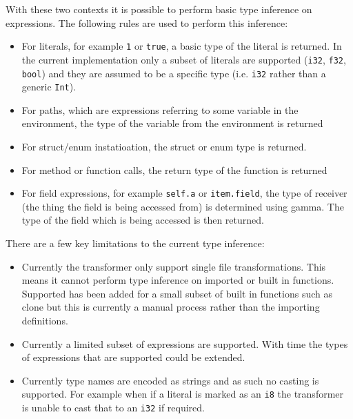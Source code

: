 \documentclass[ oneside,%
                    author={James Elgar},
                    degree={MEng},
                     title={Bidirectional transformer between functional and \\ object-oriented programming in Rust},
                  subtitle={}]{dissertation}
\newcommand{\rust}[1]{\texttt{#1}}
\begin{document}
With these two contexts it is possible to perform basic type inference on expressions. The following rules are used to perform this inference:

\begin{itemize}
    \item For literals, for example \rust{1} or \rust{true}, a basic type of the literal is returned. In the current implementation only a subset of literals are supported (\rust{i32}, \rust{f32}, \rust{bool}) and they are assumed to be a specific type (i.e. \rust{i32} rather than a generic \verb|Int|).
    \item For paths, which are expressions referring to some variable in the environment, the type of the variable from the environment is returned 
    \item For struct/enum instatioation, the struct or enum type is returned.
    \item For method or function calls, the return type of the function is returned
    \item For field expressions, for example \rust{self.a} or \rust{item.field}, the type of receiver (the thing the field is being accessed from) is determined using gamma. The type of the field which is being accessed is then returned.
\end{itemize}

There are a few key limitations to the current type inference:

\begin{itemize}
    \item  Currently the transformer only support single file transformations. This means it cannot perform type inference on imported or built in functions. Supported has been added for a small subset of built in functions such as clone but this is currently a manual process rather than the importing definitions.
    \item  Currently a limited subset of expressions are supported. With time the types of expressions that are supported could be extended.
    \item Currently type names are encoded as strings and as such no casting is supported. For example when if a literal is marked as an \rust{i8} the transformer is unable to cast that to an \rust{i32} if required.
\end{itemize}
\end{document}
